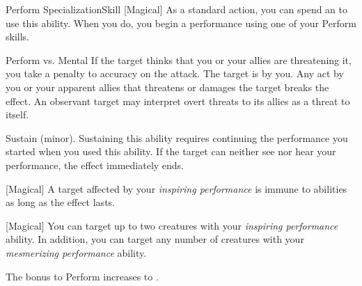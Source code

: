 \begin{feat}{Perform Specialization}{Skill}
        [Magical] As a standard action, you can spend an  to use this ability.
        When you do, you begin a performance using one of your Perform skills.
        \begin{ability}
            \begin{spelltargetinginfo}
            \end{spelltargetinginfo}
            \begin{spelleffects}
                \begin{spellattack}{Perform vs. Mental}
                    \spellspecial If the target thinks that you or your allies are threatening it, you take a  penalty to accuracy on the attack.
                    \spellsuccess The target is \fascinated by you.
                    Any act by you or your apparent allies that threatens or damages the target breaks the effect.
                    An observant target may interpret overt threats to its allies as a threat to itself.
                \end{spellattack}
                \spelldur Sustain (minor). Sustaining this ability requires continuing the performance you started when you used this ability. If the target can neither see nor hear your performance, the effect immediately ends.
            \end{spelleffects}
        \end{ability}

        [Magical] A target affected by your \textit{inspiring performance} is immune to  abilities as long as the effect lasts.

        [Magical] You can target up to two creatures with your \textit{inspiring performance} ability.
        In addition, you can target any number of creatures with your \textit{mesmerizing performance} ability.

         The bonus to Perform increases to .


\end{feat}
